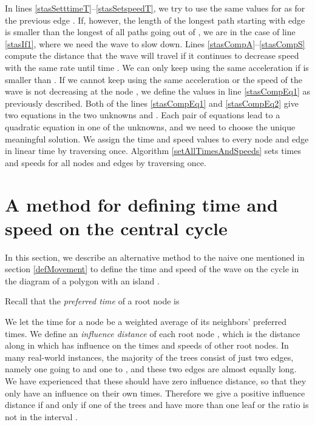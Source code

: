 \documentclass[3p]{elsarticle}
\begin{document}
In lines \ref{stasSetttimeT}--\ref{stasSetspeedT},
we try to use the same values for  as for the previous edge . If,
however, the length  of the longest path starting with edge  is smaller
than the longest of all paths going out of , we are in the case of line \ref{stasIf1},
where we need the wave to slow down.
Lines \ref{stasCompA}--\ref{stasCompS} compute the distance  that the wave will travel
if it continues to decrease speed with the same rate until time .
We can only keep using the same acceleration if  is smaller than .
If we cannot
keep using the same acceleration or the speed of the wave is not decreasing at the node ,
we define the values in line \ref{stasCompEq1}
as previously described.
Both of the lines \ref{stasCompEq1} and \ref{stasCompEq2}
give two equations in the two unknowns  and . Each pair of equations
lead to a quadratic equation in one of the unknowns,
and we need to choose the unique meaningful solution.
We assign the time and speed values to every node and edge in linear time
by traversing  once. Algorithm \ref{setAllTimesAndSpeeds} sets times and speeds for all
nodes and edges by traversing  once.

\begin{algorithm}[h]
\scriptsize
\LinesNumbered
\DontPrintSemicolon
\SetArgSty{}
  \;
  \;
  \Repeat{} {
    \uIf {} {
      \;
      \;
    } \Else {
      \;
    }
    \;
  }
\caption{}
\label{setAllTimesAndSpeeds}
\end{algorithm}

\section{A method for defining time and speed on the central cycle}\label{appB}

In this section, we describe an alternative method to the naive one mentioned in section
\ref{defMovement} to define the time and speed of the wave on the cycle 
in the diagram  of a polygon  with an island .

Recall that the \emph{preferred time} of a root node  is

We let the time for a node  be a weighted average of
its neighbors' preferred times.
We define an \emph{influence distance} 
of each root node
, which is the distance along  in which  has influence on the times and
speeds of other root nodes. In many real-world instances, the majority of the trees
 consist of just two edges, namely one going to  and one to , and these two
edges are almost equally long. We have experienced that these should have zero influence distance,
so that they only have an influence on their own times.
Therefore we give a positive influence distance if and only if one of the trees
 and  have more than one leaf or the ratio
 is not in the interval .
\end{document}
